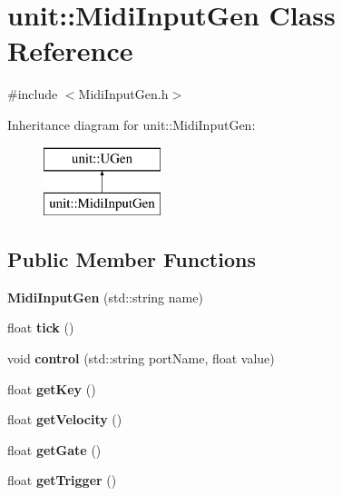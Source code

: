 \hypertarget{classunit_1_1MidiInputGen}{}\section{unit\+:\+:Midi\+Input\+Gen Class Reference}
\label{classunit_1_1MidiInputGen}


{\ttfamily \#include $<$Midi\+Input\+Gen.\+h$>$}

Inheritance diagram for unit\+:\+:Midi\+Input\+Gen\+:\begin{figure}[H]
\begin{center}
\leavevmode
\includegraphics[height=2.000000cm]{classunit_1_1MidiInputGen}
\end{center}
\end{figure}
\subsection*{Public Member Functions}
\begin{DoxyCompactItemize}
\item 
{\bfseries Midi\+Input\+Gen} (std\+::string name)\hypertarget{classunit_1_1MidiInputGen_a48063ea203958867e649466152ccebd8}{}\label{classunit_1_1MidiInputGen_a48063ea203958867e649466152ccebd8}

\item 
float {\bfseries tick} ()\hypertarget{classunit_1_1MidiInputGen_a4633d43acd7810f80ebc3ac343ba7dd3}{}\label{classunit_1_1MidiInputGen_a4633d43acd7810f80ebc3ac343ba7dd3}

\item 
void {\bfseries control} (std\+::string port\+Name, float value)\hypertarget{classunit_1_1MidiInputGen_a97db1d2b3deac8d7dd09fce65bfdca04}{}\label{classunit_1_1MidiInputGen_a97db1d2b3deac8d7dd09fce65bfdca04}

\item 
float {\bfseries get\+Key} ()\hypertarget{classunit_1_1MidiInputGen_aa180744b692b2ac4f8f5d11ef2adc245}{}\label{classunit_1_1MidiInputGen_aa180744b692b2ac4f8f5d11ef2adc245}

\item 
float {\bfseries get\+Velocity} ()\hypertarget{classunit_1_1MidiInputGen_a4e39971e955b7052df07dd9413075fc0}{}\label{classunit_1_1MidiInputGen_a4e39971e955b7052df07dd9413075fc0}

\item 
float {\bfseries get\+Gate} ()\hypertarget{classunit_1_1MidiInputGen_a9bfcd695b0dd9a3c3b0ca8cddadd9432}{}\label{classunit_1_1MidiInputGen_a9bfcd695b0dd9a3c3b0ca8cddadd9432}

\item 
float {\bfseries get\+Trigger} ()\hypertarget{classunit_1_1MidiInputGen_a4db32a60d580040a10d3b0acad2c30e3}{}\label{classunit_1_1MidiInputGen_a4db32a60d580040a10d3b0acad2c30e3}

\end{DoxyCompactItemize}
